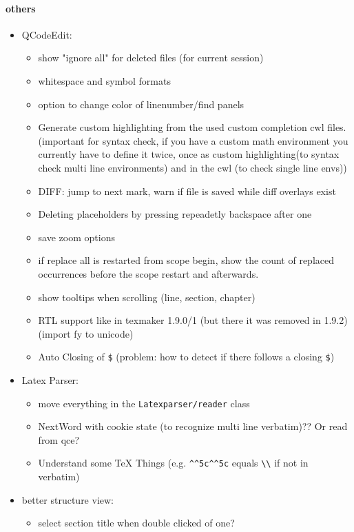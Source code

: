 \documentclass[10pt,a4paper,portrait]{article}
\begin{document}
\paragraph{others}
\begin{itemize}
	\item QCodeEdit: \begin{itemize}
		\item show "ignore all" for deleted files (for current session)
		\item whitespace and symbol formats
		\item option to change color of linenumber/find panels
		\item Generate custom highlighting from the used custom completion cwl files. (important for syntax check, if you have a custom math environment you currently have to define it twice, once as custom highlighting(to syntax check multi line environments) and in the cwl (to check single line envs))
		\item DIFF: jump to next mark, warn if file is saved while diff overlays exist
		\item Deleting placeholders by pressing repeadetly backspace after one
		\item save zoom options
		\item if replace all is restarted from scope begin, show the count of replaced occurrences before the scope restart and afterwards.
		\item show tooltips when scrolling (line, section, chapter)
		\item RTL support like in texmaker 1.9.0/1 (but there it was removed in 1.9.2) (import fy to unicode)
		\item Auto Closing of \verb+$+ (problem: how to detect if there follows a closing \verb+$+)
	\end{itemize}
	\item Latex Parser: \begin{itemize}
		\item move everything in the \verb+Latexparser/reader+ class
		\item NextWord with cookie state (to recognize multi line verbatim)?? Or read from qce?
		\item Understand some TeX Things (e.g. \verb+^^5c^^5c+ equals \verb+\\+ if not in verbatim)
	\end{itemize}
	\item better structure view: \begin{itemize}
		\item select section title when double clicked of one?	

\end{itemize}
\end{itemize}
\end{document}
